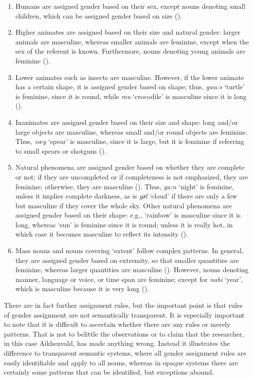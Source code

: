\documentclass[output=collectionpaper]{langsci/langscibook}
\begin{document}
\begin{enumerate}
\item Humans are assigned gender based on their sex, except nouns denoting small children, which can be assigned gender based on size (\citealt[116--117]{Aikhenvald2008}).
\item Higher animates are assigned based on their size and natural gender: larger animals are masculine, whereas smaller animals are feminine, except when the sex of the referent is known. Furthermore, nouns denoting young animals are feminine (\citealt[117]{Aikhenvald2008}).
\item Lower animates such as insects are masculine. However, if the lower animate has a certain shape, it is assigned gender based on shape; thus, \textit{gwa:s} `turtle' is feminine, since it is round, while \textit{mu} `crocodile' is masculine since it is long (\citealt[117]{Aikhenvald2008}).
\item Inanimates are assigned gender based on their size and shape: long and/or large objects are masculine, whereas small and/or round objects are feminine. Thus, \textit{vœy} `spear' is masculine, since it is large, but it is feminine if referring to small spears or shotguns (\citealt[117]{Aikhenvald2008}).
\item Natural phenomena are assigned gender based on whether they are complete or not: if they are uncompleted or if completeness is not emphasized, they are feminine; otherwise, they are masculine (\citealt[118]{Aikhenvald2008}). Thus, \textit{ga:n} `night' is feminine, unless it implies complete darkness, as is \textit{gәl} `cloud' if there are only a few but masculine if they cover the whole sky. Other natural phenomena are assigned gender based on their shape: e.g., `rainbow' is masculine since it is long, whereas `sun' is feminine since it is round; unless it is really hot, in which case it becomes masculine to reflect its intensity (\citealt[119]{Aikhenvald2008}).
\item Mass nouns and nouns covering `extent' follow complex patterns. In general, they are assigned gender based on extremity, so that smaller quantities are feminine, whereas larger quantities are masculine (\citealt[119--120]{Aikhenvald2008}). However, nouns denoting manner, language or voice, or time span are feminine; except for \textit{nabi} `year', which is masculine because it is very long (\citealt[119]{Aikhenvald2008}).
\end{enumerate}

There are in fact further assignment rules, but the important point is that rules of gender assignment are not semantically transparent. It is especially important to note that it is difficult to ascertain whether there are any rules or merely patterns. That is not to belittle the observations or to claim that the researcher, in this case Aikhenvald, has made anything wrong. Instead it illustrates the difference to transparent semantic systems, where all gender assignment rules are easily identifiable and apply to all nouns, whereas in opaque systems there are certainly some patterns that can be identified, but exceptions abound.
\end{document}
